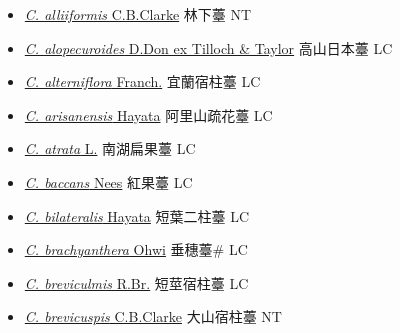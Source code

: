 \begin{itemize}
  \begin{itemize}
        \item[] \href{http://www.theplantlist.org/tpl1.1/search?q=Carex+alliiformis}{\textit{C. alliiformis} C.B.Clarke}   林下薹 NT
        \item[] \href{http://www.theplantlist.org/tpl1.1/search?q=Carex+alopecuroides}{\textit{C. alopecuroides} D.Don ex Tilloch \& Taylor}   高山日本薹 LC
        \item[] \href{http://www.theplantlist.org/tpl1.1/search?q=Carex+alterniflora}{\textit{C. alterniflora} Franch.}   宜蘭宿柱薹 LC
        \item[] \href{http://www.theplantlist.org/tpl1.1/search?q=Carex+arisanensis}{\textit{C. arisanensis} Hayata}   阿里山疏花薹 LC
        \item[] \href{http://www.theplantlist.org/tpl1.1/search?q=Carex+atrata}{\textit{C. atrata} L.}   南湖扁果薹 LC
        \item[] \href{http://www.theplantlist.org/tpl1.1/search?q=Carex+baccans}{\textit{C. baccans} Nees}   紅果薹 LC
        \item[] \href{http://www.theplantlist.org/tpl1.1/search?q=Carex+bilateralis}{\textit{C. bilateralis} Hayata}   短葉二柱薹 LC
        \item[] \href{http://www.theplantlist.org/tpl1.1/search?q=Carex+brachyanthera}{\textit{C. brachyanthera} Ohwi}     垂穗薹\# LC
        \item[] \href{http://www.theplantlist.org/tpl1.1/search?q=Carex+breviculmis}{\textit{C. breviculmis} R.Br.}   短莖宿柱薹 LC
        \item[] \href{http://www.theplantlist.org/tpl1.1/search?q=Carex+brevicuspis}{\textit{C. brevicuspis} C.B.Clarke}   大山宿柱薹 NT

\end{itemize}
\end{itemize}

